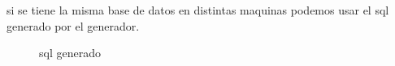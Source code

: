 si se tiene la misma base de datos en distintas maquinas podemos usar el sql generado por el generador.
\begin{figure}[H]
\caption{sql generado}\label{fig:sqlGenerated}
\centering
{}
\end{figure}





